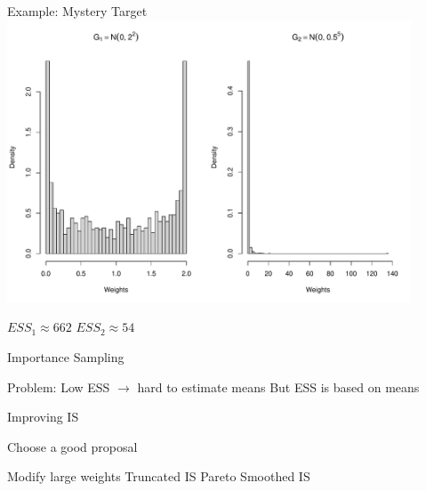 \documentclass[14pt]{beamer}
\newcommand{\bE}{\mathbb{E}}
\begin{document}
\begin{frame}{Example: Mystery Target}
    \centering
    \includegraphics[height=0.7\textheight, width=0.9\textwidth, keepaspectratio]{Figures/Wt Hist.pdf} \newline
    \begin{outline}
        $ESS_1 \approx 662$ \hspace{2.5cm} $ESS_2 \approx 54$
    \end{outline}
\end{frame}

\begin{frame}{Importance Sampling}
    \begin{outline}
        \1 Problem: Low ESS $\rightarrow$ hard to estimate means \newline
        \1 But ESS is based on means
            \2 \citep{Cha18}
    \end{outline}
\end{frame}




\begin{frame}{Improving IS}
    \begin{outline}
        \1 Choose a good proposal \newline
        
        \1 Modify large weights        
            \2 Truncated IS
            \2 Pareto Smoothed IS
    \end{outline}
\end{frame}
\end{document}
